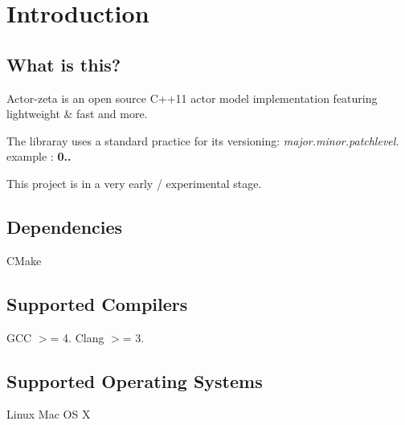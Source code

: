 \section*{Introduction}

\subsection*{What is this?}

Actor-\/zeta is an open source C++11 actor model implementation featuring lightweight \& fast and more.

The libraray uses a standard practice for its versioning\+: {\itshape major.\+minor.\+patchlevel.} example \+: {\bfseries 0..}

This project is in a very early / experimental stage.

\subsection*{Dependencies}

C\+Make

\subsection*{Supported Compilers}

G\+CC $>$= 4. Clang $>$= 3.

\subsection*{Supported Operating Systems}

Linux Mac OS X 